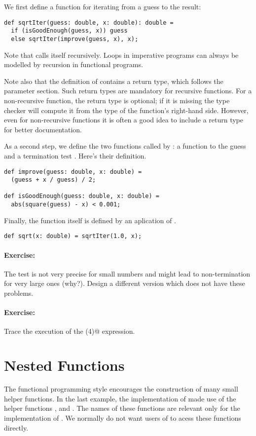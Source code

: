 \documentclass[11pt]{book}
\newcommand{\exercise}{\paragraph{Exercise:}}
\begin{document}
We first define a function for iterating from a guess to the result:
\begin{verbatim}
def sqrtIter(guess: double, x: double): double = 
  if (isGoodEnough(guess, x)) guess
  else sqrtIter(improve(guess, x), x);
\end{verbatim}
Note that \verb@sqrtIter@ calls itself recursively.  Loops in
imperative programs can always be modelled by recursion in functional
programs. 

Note also that the definition of \verb@sqrtIter@ contains a return
type, which follows the parameter section. Such return types are
mandatory for recursive functions. For a non-recursive function, the
return type is optional; if it is missing the type checker will
compute it from the type of the function's right-hand side. However,
even for non-recursive functions it is often a good idea to include a
return type for better documentation.

As a second step, we define the two functions called by
\verb@sqrtIter@: a function to \verb@improve@ the guess and a
termination test \verb@isGoodEnough@. Here's their definition.
\begin{verbatim}
def improve(guess: double, x: double) = 
  (guess + x / guess) / 2;

def isGoodEnough(guess: double, x: double) = 
  abs(square(guess) - x) < 0.001;
\end{verbatim}

Finally, the \verb@sqrt@ function itself is defined by an aplication
of \verb@sqrtIter@.
\begin{verbatim}
def sqrt(x: double) = sqrtIter(1.0, x);
\end{verbatim}

\exercise The \verb@isGoodEnough@ test is not very precise for small numbers
and might lead to non-termination for very large ones (why?).
Design a different version \verb@isGoodEnough@ which does not have these problems.

\exercise Trace the execution of the \verb@sqrt(4)@ expression.

\section{Nested Functions}

The functional programming style encourages the construction of many
small helper functions. In the last example, the implementation
of \verb@sqrt@ made use of the helper functions
\verb@sqrtIter@, \verb@improve@ and
\verb@isGoodEnough@. The names of these functions 
are relevant only for the implementation of
\verb@sqrt@. We normally do not want users of \verb@sqrt@ to acess these functions
directly.
\end{document}

